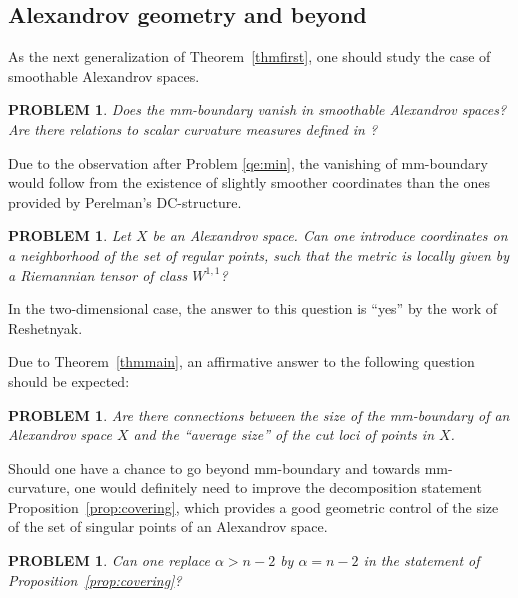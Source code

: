 \documentclass[12pt,leqno,intlimits]{amsart}
\numberwithin{equation}{section}
\newtheorem{quest}[thm]{PROBLEM}
\theoremstyle{definition}
\theoremstyle{remark}
\newcommand{\tref}[1]{Theorem~\ref{#1}}
\newcommand{\pref}[1]{Proposition~\ref{#1}}
\begin{document}
\subsection{Alexandrov geometry and beyond}
As the next generalization of \tref{thmfirst}, one should study the case of smoothable Alexandrov spaces.

\begin{quest}
Does the mm-boundary vanish in smoothable Alexandrov spaces? Are there relations to scalar curvature measures defined in \cite{LP}?
\end{quest}

Due to the observation after Problem \ref{qe:min}, the vanishing of mm-boundary would follow from the existence of slightly smoother coordinates than the ones provided by Perelman's DC-structure.
\begin{quest}
Let $X$ be an Alexandrov space. Can one introduce coordinates on a neighborhood of the set of regular points, such that the metric is locally given by a Riemannian tensor of class $W^{1,1}$?
\end{quest}
In the two-dimensional case, the answer to this question is ``yes'' by the work of Reshetnyak.

Due to \tref{thmmain}, an affirmative answer to the following question should be expected:
\begin{quest}
Are there connections between the size of the mm-boundary of an Alexandrov space $X$ and the ``average size'' of the cut loci of points in $X$.
\end{quest}

Should one have a chance to go beyond mm-boundary and towards mm-curvature, one would definitely need to improve the
decomposition statement \pref{prop:covering}, which provides a good geometric control of the size of the set of singular points of an Alexandrov space.
\begin{quest} \label{qe:control}
Can one replace $\alpha>n-2$ by $\alpha=n-2$ in the statement of \pref{prop:covering}?
\end{quest}
\end{document}
